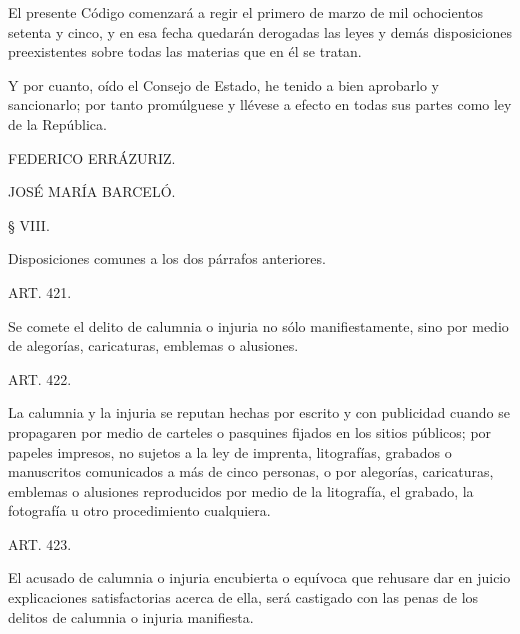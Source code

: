     El presente Código comenzará a regir el primero de marzo de mil ochocientos setenta y cinco, y en esa fecha quedarán derogadas las leyes y demás disposiciones preexistentes sobre todas las materias que en él se tratan.


    Y por cuanto, oído el Consejo de Estado, he tenido a bien aprobarlo y sancionarlo; por tanto promúlguese y llévese a efecto en todas sus partes como ley de la República.

    FEDERICO ERRÁZURIZ.

    JOSÉ MARÍA BARCELÓ.




















    















    § VIII.

    Disposiciones comunes a los dos párrafos anteriores.








    ART. 421.

    Se comete el delito de calumnia o injuria no sólo manifiestamente, sino por medio de alegorías, caricaturas, emblemas o alusiones.


    ART. 422.

    La calumnia y la injuria se reputan hechas por escrito y con publicidad cuando se propagaren por medio de carteles o pasquines fijados en los sitios públicos; por papeles impresos, no sujetos a la ley de imprenta, litografías, grabados o manuscritos comunicados a más de cinco personas, o por alegorías, caricaturas, emblemas o alusiones reproducidos por medio de la litografía, el grabado, la fotografía u otro procedimiento cualquiera.



    ART. 423.

    El acusado de calumnia o injuria encubierta o equívoca que rehusare dar en juicio explicaciones satisfactorias acerca de ella, será castigado con las penas de los delitos de calumnia o injuria manifiesta.

